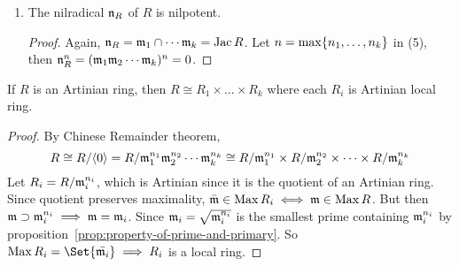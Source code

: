 \begin{prop}
\begin{enumerate}[(1)]
\begin{proof}
        Now, let $n_i$ be the one so that $\mf_i^{n_i} = \mf_{i+1}^{n_{i+1}}$.
        We claim that $\mf_1^{n_1}\mf_2^{n_2} \dotsm \mf_k^{n_k} = \gen{0}$.

        If not, let $\Sc = \Set{J \subseteq R \given J \mf_1^{n_1}
          \mf_2^{n_2} \dotsm \mf_k^{n_k} \neq 0} \neq \varnothing$
        since $\mf_i \in S$.
        By the fact that $R$ is Artinian, there exists
        a minimal element $J_0 \in \Sc$.
        By definition of $\Sc$, Exists $x \in J_0$ so that $x\mf_1^{n_1}\mf_2^{n_2} \dotsm \mf_k^{n_k}
        \neq 0$. Then $\gen{x} \in \Sc$ $\gen{x} \subseteq J_0$
        which by the minimality we must have $\gen{x} = J_0$.\\

        Also, $x \mf_1^{n_1+1}\mf_2^{n_2+1} \dotsm \mf_k^{n_k+1} =
        x \mf_1^{n_1}\mf_2^{n_2} \dotsm \mf_k^{n_k} \ne \gen{0}$,
        so $I = x \mf_1\dots \mf_k\in S$ and $I \subseteq xR = J_0 \implies I = xR$.
        Then we have $\mf_1 \mf_2 \dotsm \mf_k = \mf_1 \cap \mf_2 \cap \dots \cap \mf_k = \Jac R$
        with $\Jac R (xR) = xR$ since $\Max R = \Spec R$. By Nakayama's lemma, $xR = 0 \implies x = 0$
        which leads to an contradiction.
      \end{proof}
    \item The nilradical $\mathfrak{n}_R$ of $R$ is nilpotent.
      \begin{proof}
        Again, $\mathfrak{n}_R = \mathfrak{m}_1 \cap \dotsm \mathfrak{m}_k = \operatorname{Jac} R$. Let $n = \max \lbrace n_1, \dots, n_k\rbrace$ in (5),
        then $\mathfrak{n}_R^n = (\mathfrak{m}_1\mathfrak{m}_2 \dotsm\mathfrak{m}_k)^n = 0$.
      \end{proof}
  \end{enumerate}
\end{prop}

\begin{theorem}
  If $R$ is an Artinian ring,
  then $R \cong R_1 \times \dots \times R_k$ where each $R_i$ is Artinian local ring.
\begin{proof}
  By Chinese Remainder theorem,
  \[
    R \cong {R}/{\langle0\rangle} = {R}/{\mathfrak{m}_1^{n_1}\mathfrak{m}_2^{n_2} \dotsm \mathfrak{m}_k^{n_k}}
    \cong 
    {R}/{\mathfrak{m}_1^{n_1}} \times {R}/{\mathfrak{m}_2^{n_2}} \times \dots \times {R}/{\mathfrak{m}_k^{n_k}}
  \]
  Let $R_i = {R}/{\mathfrak{m}_i^{n_i}}$, which is Artinian since
  it is the quotient of an Artinian ring. Since
  quotient preserves maximality, $\bar{\mathfrak{m}} \in \operatorname{Max} R_i \iff
  \mathfrak{m} \in \operatorname{Max} R$. But then $\mathfrak{m} \supset \mathfrak{m}_i^{n_i} \implies \mathfrak{m} = \mathfrak{m}_i$.
  Since $\mathfrak{m}_i = \sqrt{\mathfrak{m}_i^{n_i}}$ is the smallest prime containing $\mathfrak{m}_i^{n_i}$
  by proposition~\ref{prop:property-of-prime-and-primary}.
  So $\Max R_i = \Set{\bar{\mf_i}} \implies R_i$ is a local ring.
\end{proof}
\end{theorem}

